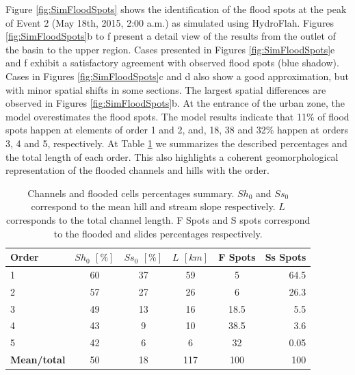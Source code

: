 \documentclass[hess, manuscript]{copernicus}
\begin{document}
Figure \ref{fig:SimFloodSpots} shows the identification of the flood spots at the peak of Event 2 (May 18th, 2015, 2:00 a.m.) as simulated using HydroFlah. Figures \ref{fig:SimFloodSpots}b to f present a detail view of the results from the outlet of the basin to the upper region.  Cases presented in Figures \ref{fig:SimFloodSpots}e and f exhibit a satisfactory agreement with observed flood spots (blue shadow).  Cases in Figures \ref{fig:SimFloodSpots}c and d also show a good approximation, but with minor spatial shifts in some sections. The largest spatial differences are observed in Figures \ref{fig:SimFloodSpots}b. At the entrance of the urban zone, the model overestimates the flood spots.  The model results indicate that 11\% of flood spots happen at elements of order 1 and 2,  and, 18, 38 and 32\% happen at orders 3, 4 and 5, respectively.  At Table \ref{tab:flash} we summarizes the described percentages and the total length of each order.  This also highlights a coherent geomorphological representation of the flooded channels and hills with the order.\\   

\begin{table}[!h]
\centering
  \caption{Channels and flooded cells percentages summary.  $Sh_0$ and $Ss_0$ correspond to the mean hill and stream slope respectively. $L$ corresponds to the total channel length. F Spots and S spots correspond to the flooded and slides percentages respectively.}
\begin{tabular}{lccccr}
\hline
Order & $Sh_0$ $[\%]$ & $Ss_0$  $[\%]$ & $L$ $[km]$ & F Spots & Ss Spots \\
\hline
1 & 60 & 37 & 59 & 5 & 64.5 \\
2 & 57 & 27 & 26 & 6 & 26.3\\
3 & 49 & 13 & 16 & 18.5 & 5.5\\
4 & 43 & 9 & 10 & 38.5 & 3.6\\
5 & 42 & 6 & 6 & 32 & 0.05\\
\hline
\textbf{Mean/total} & 50 & 18 & 117 & 100 & 100 \\
\hline
\end{tabular}
\label{tab:flash}
\end{table}
\end{document}
